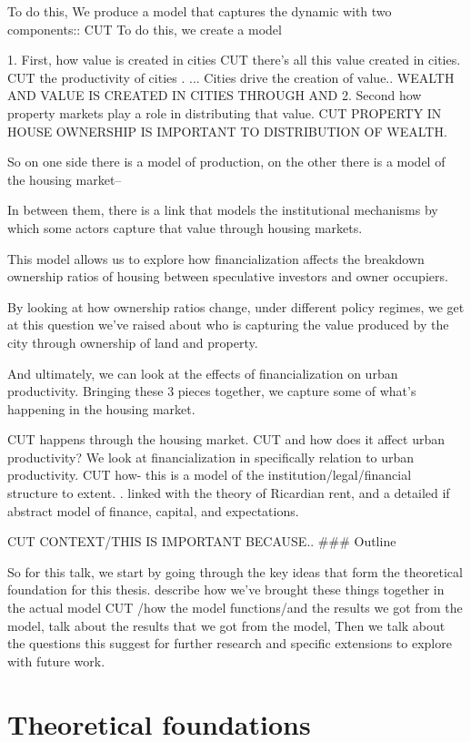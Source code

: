 To do this,  We produce a model that captures the dynamic with two components::
CUT To do this, we create a model 

 1. First, how value is created in cities CUT there's all this value created in cities.  CUT the productivity of cities . ...  Cities drive the creation of value.. WEALTH AND VALUE IS CREATED IN CITIES THROUGH AND 
 2. Second how property markets play a role in distributing that value. CUT PROPERTY IN HOUSE OWNERSHIP IS IMPORTANT TO DISTRIBUTION OF WEALTH. 

So on one side there is a model of production, on the other there is a model of the housing market-- 

In between them, there is a link that models the institutional mechanisms by which some actors capture that value through housing markets.


This model allows us to explore  how financialization affects the breakdown ownership ratios of housing between speculative investors and owner occupiers. 

By looking at how ownership ratios change, under different policy regimes, 
we get at this question we've raised about who is capturing the value produced by the city through ownership of land and property. 

And ultimately, we can look at the effects of financialization on urban productivity.  
Bringing these 3 pieces together, we capture  some of what's happening in the housing market.

CUT happens through the housing market.
CUT and how does it affect urban productivity? We look at financialization in specifically relation to urban productivity.
CUT how- this is a model of the institution/legal/financial structure to extent. . linked with the theory of Ricardian rent, and a detailed if abstract model of finance, capital, and expectations. 


CUT CONTEXT/THIS IS IMPORTANT BECAUSE..
### Outline

So for this talk, we  start by going through the key ideas that form the theoretical foundation for this thesis. 
 describe how we've brought these things together in the actual model CUT /how the model functions/and the results we got from the model,
talk about the results that we got from the model,
Then we talk about the questions this suggest for further research and specific extensions to explore with future work. 

\section{Theoretical foundations}

